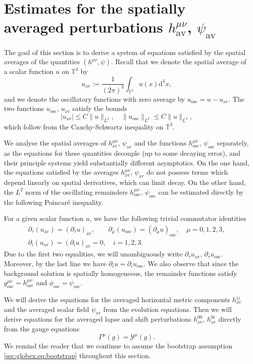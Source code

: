 \documentclass{article}
\newcommand{\TT}{\mathbb{T}}
\newcommand{\osc}{\mathrm{osc}}
\newcommand{\av}{\mathrm{av}}
\newcommand{\de}{\mathrm{d}}
\newcommand{\mc}{\mathcal}
\newcommand{\pa}{\partial}
\begin{document}
\section{Estimates for the spatially averaged perturbations \texorpdfstring{$h_{\av}^{\mu\nu}$, $\psi_{\av}$}{ }}\label{sec:avgsys}
The goal of this section is to derive a system of equations satisfied by the spatial averages of the quantities $(h^{\mu\nu},\psi)$. Recall that we denote the spatial average of a scalar function $u$ on $\TT^3$ by
\begin{equation}
    u_{\av}:=\frac{1}{(2\pi)^3}\int_{\TT^3}u(x)\de^3 x,
\end{equation}
and we denote the oscillatory functions with zero average by $u_{\osc} = u - u_{\av}$.
The two functions $u_{\osc}$, $u_{\av}$ satisfy the bounds
\begin{equation}\label{sec:avgsys.eq:avgbound}
    |u_\av| \leq C\|u\|_{L^2},\quad \|u_{\osc}\|_{L^2}\leq C\|u\|_{L^2},
\end{equation}
which follow from the Cauchy-Schwartz inequality on $\TT^3$.

We analyse the spatial averages of $h_{\av}^{\mu\nu}$, $\psi_{\av}$ and the functions $h_{\osc}^{\mu\nu}$, $\psi_{\osc}$ separately, as the equations for these quantities decouple (up to some decaying error), and their principle systems yield substantially different asymptotics. On the one hand, the equations satisfied by the averages $h_{\av}^{\mu\nu}$, $\psi_{\av}$ do not possess terms which depend linearly on spatial derivatives, which can limit decay. On the other hand, the $L^2$ norm of the oscillating remainders $h_{\osc}^{\mu\nu}$, $\psi_{\osc}$ can be estimated directly by the following Poincar\'e inequality.

For a given scalar function $u$, we have the following trivial commutator identities
\begin{gather}
    \pa_\tau (u_{\av}) = (\pa_\tau u)_{\av},\qquad \pa_\mu (u_{\osc}) = (\pa_\mu u)_{\osc}, \quad \mu=0,1,2,3,\\
    \pa_i (u_{\av}) = (\pa_i u)_{\av} = 0,\quad i=1,2,3.
\end{gather}
Due to the first two equalities, we will unambiguously write $\pa_\tau u_{\av}$, $\pa_\tau u_{\osc}$. Moreover, by the last line we have $\pa_i u = \pa_i u_{\osc}$. We also observe that since the background solution is spatially homogeneous, the remainder functions satisfy $g^{\mu\nu}_{\osc} =  h^{\mu\nu}_{\osc}$ and $\phi_{\osc} = \psi_{\osc}$.

We will derive the equations for the averaged horizontal metric components $h_{\av}^{ij}$ and the averaged scalar field $\psi_{\av}$ from the evolution equations. Then we will derive equations for the averaged lapse and shift perturbations $h_{\av}^{00}$, $h_{\av}^{0i}$ directly from the gauge equations
\begin{equation}
    \Gamma^\mu(g) = \mc{Y}^{\mu}(g).
\end{equation}
We remind the reader that we continue to assume the bootstrap assumption \eqref{sec:globex.eq:bootstrap} throughout this section.
\end{document}
